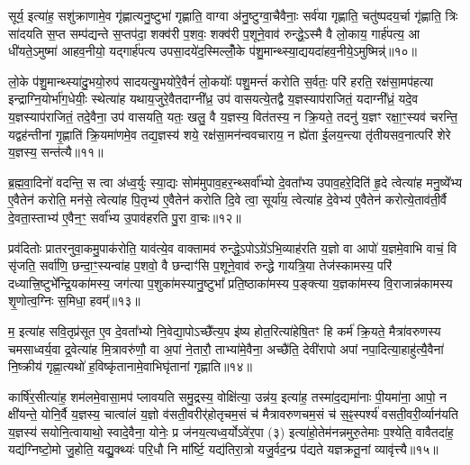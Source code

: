 सूर्य॒ इत्या॑ह॒ सशु॑क्राणामे॒व गृ॑ह्णात्यनु॒ष्टुभा॑ गृह्णाति॒ वाग्वा अ॑नु॒ष्टुग्वा॒चैवैनाः॒ सर्व॑या गृह्णाति॒ चतु॑ष्पदय॒र्चा गृ॑ह्णाति॒ त्रिः सा॑दयति स॒प्त सम्प॑द्यन्ते स॒प्तप॑दा॒ शक्व॑री प॒शवः॒ शक्व॑री प॒शूने॒वाव॑ रुन्द्धे॒\-ऽस्मै वै लो॒काय॒ गार्\mbox{}ह॑पत्य॒ आ धी॑यते॒\-ऽमुष्मा॑ आहव॒नीयो॒ यद्गार्\mbox{}ह॑पत्य उपसा॒दये॑द॒स्मिल्लोँ॒के प॑शु॒मान्थ्स्या॒द्ययदा॑हव॒नीये॒\-ऽमुष्मिन्न्॑॥१०॥

लो॒के प॑शु॒मान्थ्स्या॑दु॒भयो॒रुप॑ सादयत्यु॒भयो॑रे॒वैनं॑ लो॒कयोः᳚ पशु॒मन्तं॑ करोति स॒र्वतः॒ परि॑ हरति॒ रक्ष॑सा॒मप॑हत्या इन्द्राग्नि॒योर्भा॑ग॒धेयीः॒ स्थेत्या॑ह यथाय॒जुरे॒वैतदाग्नी᳚ध्र॒ उप॑ वासयत्ये॒तद्वै य॒ज्ञस्याप॑राजितं॒ यदाग्नी᳚ध्रं॒ यदे॒व य॒ज्ञस्याप॑राजितं॒ तदे॒वैना॒ उप॑ वासयति॒ यतः॒ खलु॒ वै य॒ज्ञस्य॒ वित॑तस्य॒ न क्रि॒यते॒ तदनु॑ य॒ज्ञꣳ रक्षा॒ꣳ॒स्यव॑ चरन्ति॒ यद्वह॑न्तीनां गृ॒ह्णाति॑ क्रि॒यमा॑णमे॒व तद्य॒ज्ञस्य॑ शये॒ रक्ष॑सा॒मन॑न्ववचाराय॒ न ह्ये॑ता ई॒लय॒न्त्या तृ॑तीयसव॒नात्परि॑ शेरे य॒ज्ञस्य॒ सन्त॑त्यै॥११॥

{\anuvakamend[{स्या॒दिन्द्रो॑ गृह्णी॒याद॑स्त्व॒मुष्मि॑न्क्रि॒यते॒ षड्विꣳ॑शतिश्च॥२॥}]}

ब्र॒ह्म॒वा॒दिनो॑ वदन्ति॒ स त्वा अ॑ध्व॒र्युः स्या॒द्यः सोम॑मुपाव॒हर॒न्थ्सर्वा᳚भ्यो दे॒वता᳚भ्य उपाव॒हरे॒दिति॑ हृ॒दे त्वेत्या॑ह मनु॒ष्ये᳚भ्य ए॒वैतेन॑ करोति॒ मन॑से॒ त्वेत्या॑ह पि॒तृभ्य॑ ए॒वैतेन॑ करोति दि॒वे त्वा॒ सूर्या॑य॒ त्वेत्या॑ह दे॒वेभ्य॑ ए॒वैतेन॑ करोत्ये॒ताव॑ती॒र्वै दे॒वता॒स्ताभ्य॑ ए॒वैन॒ꣳ॒ सर्वा᳚भ्य उ॒पाव॑हरति पु॒रा वा॒चः॥१२॥

प्रव॑दितोः प्रातरनुवा॒कमु॒पाक॑रोति॒ याव॑त्ये॒व वाक्तामव॑ रुन्द्धे॒\-ऽपो\-ऽग्रे॑\-ऽभि॒व्याह॑रति य॒ज्ञो वा आपो॑ य॒ज्ञमे॒वाभि वाचं॒ वि सृ॑जति॒ सर्वा॑णि॒ छन्दा॒ꣳ॒स्यन्वा॑ह प॒शवो॒ वै छन्दाꣳ॑सि प॒शूने॒वाव॑ रुन्द्धे गायत्रि॒या तेज॑स्कामस्य॒ परि॑ दध्यात्त्रि॒ष्टुभे᳚न्द्रि॒यका॑मस्य॒ जग॑त्या प॒शुका॑मस्यानु॒ष्टुभा᳚ प्रति॒ष्ठाका॑मस्य प॒ङ्क्त्या य॒ज्ञका॑मस्य वि॒राजान्न॑कामस्य शृ॒णोत्व॒ग्निः स॒मिधा॒ हवम्᳚॥१३॥

म॒ इत्या॑ह सवि॒तृप्र॑सूत ए॒व दे॒वता᳚भ्यो नि॒वेद्या॒पो\-ऽच्छै᳚त्य॒प इ॑ष्य होत॒रित्या॑हेषि॒तꣳ हि कर्म॑ क्रि॒यते॒ मैत्रा॑वरुणस्य चमसाध्वर्य॒वा द्र॒वेत्या॑ह मि॒त्रावरु॑णौ॒ वा अ॒पां ने॒तारौ॒ ताभ्या॑मे॒वैना॒ अच्छै॑ति॒ देवी॑रापो अपां नपा॒दित्या॒हाहु॑त्यै॒वैना॑ नि॒ष्क्रीय॑ गृह्णा॒त्यथो॑ ह॒विष्कृ॑तानामे॒वाभिघृ॑तानां गृह्णाति॥१४॥

कार्\mbox{}षि॑र॒सीत्या॑ह॒ शम॑लमे॒वासा॒मप॑ प्लावयति समु॒द्रस्य॒ वोक्षि॑त्या॒ उन्न॑य॒ इत्या॑ह॒ तस्मा॑द॒द्यमा॑नाः पी॒यमा॑ना॒ आपो॒ न क्षी॑यन्ते॒ योनि॒र्वै य॒ज्ञस्य॒ चात्वा॑लं य॒ज्ञो व॑सती॒वरीर्\mbox{}॑होतृचम॒सं च॑ मैत्रावरुणचम॒सं च॑ स॒ꣴ॒स्पर्श्य॑ वसती॒वरी॒र्व्यान॑यति य॒ज्ञस्य॑ सयोनि॒त्वायाथो॒ स्वादे॒वैना॒ योनेः॒ प्र ज॑नय॒त्यध्व॒र्यो\-ऽवे॑र॒पा (३) इत्या॑हो॒तेम॑नन्नमुरु॒तेमाः प॒श्येति॒ वावैतदा॑ह॒ यद्य॑ग्निष्टो॒मो जु॒होति॒ यद्यु॒क्थ्यः॑ परि॒धौ नि मा᳚र्ष्टि॒ यद्य॑तिरा॒त्रो यजु॒र्वद॒न्प्र प॑द्यते यज्ञक्रतू॒नां व्यावृ॑त्त्यै॥१५॥

